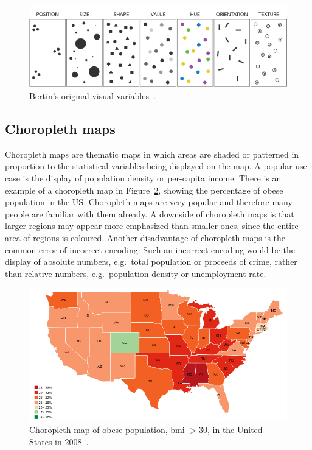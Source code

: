 \begin{figure}
  \centering
  \includegraphics[width=\textwidth]{figures/related-work/visual-variables}
  \caption{Bertin's original visual variables~\parencite{Foster2017}.}
  \label{fig:related-work:visual-variables}
\end{figure}

\subsection{Choropleth maps}
Choropleth maps are thematic maps in which areas are shaded or patterned in proportion to the statistical variables being displayed on the map.
A popular use case is the display of population density or per-capita income.
There is an example of a choropleth map in Figure~\ref{fig:related-work:choropleth}, showing the percentage of obese population in the US\@.
Choropleth maps are very popular and therefore many people are familiar with them already.
A downside of choropleth maps is that larger regions may appear more emphasized than smaller ones, since the entire area of regions is coloured.
Another disadvantage of choropleth maps is the common error of incorrect encoding:
Such an incorrect encoding would be the display of absolute numbers, e.g.\ total population or proceeds of crime, rather than relative numbers, e.g.\ population density or unemployment rate.

\begin{figure}
  \includegraphics[width=\textwidth]{figures/related-work/choropleth}
  \caption{%
    Choropleth map of obese population, \gls{bmi} $ > 30 $, in the United States in 2008~\parencite{NCCDPHP2017}.
  }\label{fig:related-work:choropleth}
\end{figure}

